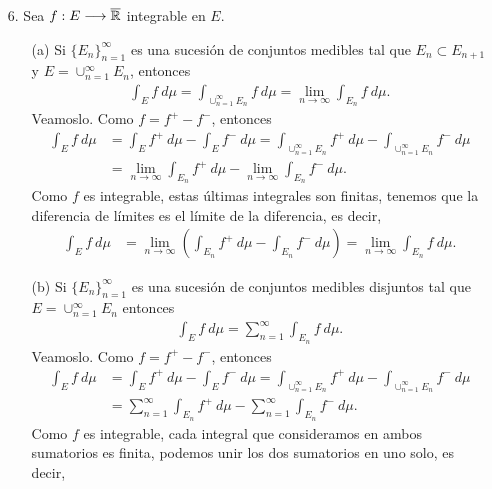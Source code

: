\begin{obs}
\begin{enumerate}
    \item[6.] Sea $f: E \longrightarrow \overline{\mathbb{R}}$ integrable en $E$.
    \begin{enumerate}
        \item[(a)] Si $\{E_n\}_{n=1}^{\infty}$ es una sucesión de conjuntos medibles tal que $E_n \subset E_{n+1}$ y $E = \cup_{n=1}^{\infty}{E_n}$, entonces
        \begin{align*}
            \int_{E}{f \ d\mu} = \int_{\cup_{n=1}^{\infty}{E_n}}{f \ d\mu} =\lim_{n \to \infty}{\int_{E_n}{f \ d\mu}}.
        \end{align*}
        Veamoslo. Como $f = f^+ - f^-$, entonces
        \begin{align*}
            \int_{E}{f \ d\mu} &= \int_{E}{f^+ \ d\mu} - \int_{E}{f^- \ d\mu} = \int_{\cup_{n=1}^{\infty}{E_n}}{f^+ \ d\mu} - \int_{\cup_{n=1}^{\infty}{E_n}}{f^- \ d\mu}\\
            &= \lim_{n \to \infty}{\int_{E_n}{f^+ \ d\mu}} - \lim_{n \to \infty}{\int_{E_n}{f^- \ d\mu}}.
        \end{align*}
        Como $f$ es integrable, estas últimas integrales son finitas, tenemos que la diferencia de límites es el límite de la diferencia, es decir,
        \begin{align*}
            \int_{E}{f \ d\mu} &= \lim_{n \to \infty}{\left( \int_{E_n}{f^+ \ d\mu} - \int_{E_n}{f^- \ d\mu}\right)} = \lim_{n \to \infty}{\int_{E_n}{f \ d\mu}}.
        \end{align*}
        \item[(b)] Si $\{E_n\}_{n=1}^{\infty}$ es una sucesión de conjuntos medibles disjuntos tal que $E = \cup_{n=1}^{\infty}{E_n}$ entonces
        \begin{align*}
            \int_{E}{f \ d\mu} = \sum_{n=1}^{\infty}{\int_{E_n}{f \ d\mu}}.
        \end{align*}
        Veamoslo. Como $f = f^+ - f^-$, entonces
        \begin{align*}
            \int_{E}{f \ d\mu} &= \int_{E}{f^+ \ d\mu} - \int_{E}{f^- \ d\mu} = \int_{\cup_{n=1}^{\infty}{E_n}}{f^+ \ d\mu} - \int_{\cup_{n=1}^{\infty}{E_n}}{f^- \ d\mu}\\
            &= \sum_{n=1}^{\infty}{\int_{E_n}{f^+ \ d\mu}} - \sum_{n=1}^{\infty}{\int_{E_n}{f^- \ d\mu}}.
        \end{align*}
        Como $f$ es integrable, cada integral que consideramos en ambos sumatorios es finita, podemos unir los dos sumatorios en uno solo, es decir,
        \begin{align*}

\end{align*}
\end{enumerate}
\end{enumerate}
\end{obs}
